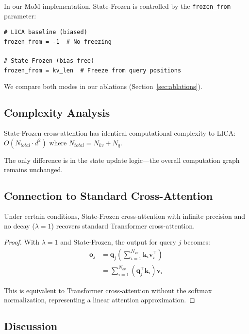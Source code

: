 In our MoM implementation, State-Frozen is controlled by the \texttt{frozen\_from} parameter:

\begin{verbatim}
# LICA baseline (biased)
frozen_from = -1  # No freezing

# State-Frozen (bias-free)
frozen_from = kv_len  # Freeze from query positions
\end{verbatim}

We compare both modes in our ablations (Section~\ref{sec:ablations}).

\subsection{Complexity Analysis}

\begin{proposition}
State-Frozen cross-attention has identical computational complexity to LICA: $O(N_{total} \cdot d^2)$ where $N_{total} = N_{kv} + N_q$.
\end{proposition}

The only difference is in the state update logic—the overall computation graph remains unchanged.

\subsection{Connection to Standard Cross-Attention}

\begin{theorem}
Under certain conditions, State-Frozen cross-attention with infinite precision and no decay ($\lambda = 1$) recovers standard Transformer cross-attention.
\end{theorem}

\begin{proof}
With $\lambda = 1$ and State-Frozen, the output for query $j$ becomes:
\begin{align}
\mathbf{o}_j &= \mathbf{q}_j \left(\sum_{i=1}^{N_{kv}} \mathbf{k}_i \mathbf{v}_i^\top \right) \\
&= \sum_{i=1}^{N_{kv}} (\mathbf{q}_j^\top \mathbf{k}_i) \mathbf{v}_i
\end{align}

This is equivalent to Transformer cross-attention without the softmax normalization, representing a linear attention approximation.
\end{proof}

\subsection{Discussion}

